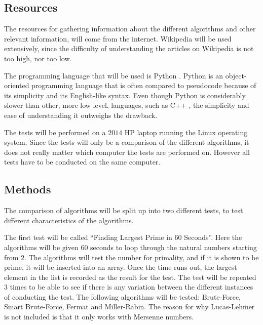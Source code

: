 \documentclass[main.tex]{subfiles}
\begin{document}
\subsection{Resources}
The resources for gathering information about the different algorithms and other
relevant information, will come from the internet. Wikipedia \cite{wikipedia}
will be used extensively, since the difficulty of understanding the articles on
Wikipedia is not too high, nor too low. \newline

The programming language that will be used is Python \cite{python}. Python is an
object-oriented programming language that is often compared to pseudocode
because of its simplicity and its English-like syntax. Even though Python is
considerably slower \cite{pythonvscpp} than other, more low level, languages,
such as C++ \cite{cpp}, the simplicity and ease of understanding it outweighs
the drawback. \newline

The tests will be performed on a $2014$ HP laptop running the Linux operating
system. Since the tests will only be a comparison of the different algorithms,
it does not really matter which computer the tests are performed on. However all
tests have to be conducted on the same computer.

\subsection{Methods}
The comparison of algorithms will be split up into two different tests, to test
different characteristics of the algorithms. \newline

The first test will be called ``Finding Largest Prime in 60 Seconds''. Here
the algorithms will be given $60$ seconds to loop through the natural numbers
starting from $2$. The algorithms will test the number for primality, and if it
is shown to be prime, it will be inserted into an array. Once the time runs out,
the largest element in the list is recorded as the result for the test. The test
will be repeated $3$ times to be able to see if there is any variation between
the different instances of conducting the test. The following algorithms will be
tested: Brute-Force, Smart Brute-Force, Fermat and Miller-Rabin. The reason for
why Lucas-Lehmer is not included is that it only works with Mersenne numbers.
\newline
\end{document}
